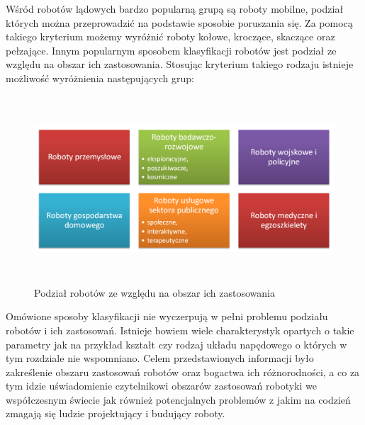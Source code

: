 Wśród robotów lądowych bardzo popularną grupą są roboty mobilne, podział których
można przeprowadzić na podstawie sposobie poruszania się. Za pomocą takiego
kryterium możemy wyróżnić roboty kołowe, kroczące, skaczące oraz pełzające.
Innym popularnym sposobem klasyfikacji robotów jest podział ze względu na 
obszar ich zastosowania. Stosując kryterium takiego rodzaju istnieje możliwość
wyróżnienia następujących grup:
\begin{figure}[hb]
 \centering
 \includegraphics[height=70mm]{../images/ch01/robot_types.png}
 \caption{Podział robotów ze względu na obszar ich zastosowania}
 \label{fig:RobotsDiv}
\end{figure}

Omówione sposoby klasyfikacji nie wyczerpują w pełni problemu podziału
robotów i ich zastosowań. Istnieje bowiem wiele charakterystyk opartych o takie
parametry jak na przykład kształt czy rodzaj układu napędowego o których w tym
rozdziale nie wspomniano. Celem przedstawionych informacji było zakreślenie
obszaru zastosowań robotów oraz bogactwa ich różnorodności, a co za tym idzie
uświadomienie czytelnikowi obszarów zastosowań robotyki we współczesnym świecie
jak również potencjalnych problemów z jakim na codzień zmagają się ludzie
projektujący i budujący roboty.
